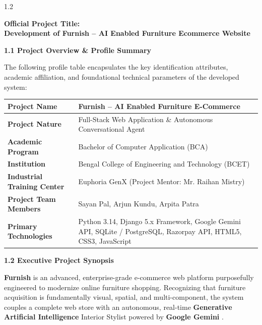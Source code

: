 \documentclass[12pt,a4paper]{article}
\begin{document}
{\fontsize{60}{20}\selectfont
\begin{spacing}{1.2}

\noindent
\textbf{Official Project Title:} \\
{\color{bcetblue}\textbf{\fontsize{16}{22}\selectfont Development of Furnish -- AI Enabled Furniture Ecommerce Website}}

\vspace{0.15in}

\noindent
\textbf{1.1 Project Overview \& Profile Summary}

\vspace{0.05in}

\noindent
The following profile table encapsulates the key identification attributes, academic affiliation, and foundational technical parameters of the developed system:

\vspace{0.3in}

\begin{center}
\renewcommand{\arraystretch}{1.25}
\fontsize{12}{16}\selectfont
\begin{tabular}{|p{2.1in}|p{4.4in}|}
\hline
\textbf{Project Name} & \textbf{Furnish} -- AI Enabled Furniture E-Commerce \\ \hline
\textbf{Project Nature} & Full-Stack Web Application \& Autonomous Conversational Agent \\ \hline
\textbf{Academic Program} & Bachelor of Computer Application (BCA) \\ \hline
\textbf{Institution} & Bengal College of Engineering and Technology (BCET) \\ \hline
\textbf{Industrial Training Center} & Euphoria GenX (Project Mentor: Mr. Raihan Mistry) \\ \hline
\textbf{Project Team Members} & Sayan Pal, Arjun Kundu, Arpita Patra \\ \hline
\textbf{Primary Technologies} & Python 3.14, Django 5.x Framework, Google Gemini API, SQLite / PostgreSQL, Razorpay API, HTML5, CSS3, JavaScript \\ \hline
\end{tabular}
\end{center}

\vspace{0.3in}

\noindent
\textbf{1.2 Executive Project Synopsis}

\vspace{0.05in}

\noindent
\textbf{Furnish} is an advanced, enterprise-grade e-commerce web platform purposefully engineered to modernize online furniture shopping. Recognizing that furniture acquisition is fundamentally visual, spatial, and multi-component, the system couples a complete web store with an autonomous, real-time \textbf{Generative Artificial Intelligence}  Interior Stylist powered by \textbf{Google Gemini} .


\end{spacing}}
\end{document}
